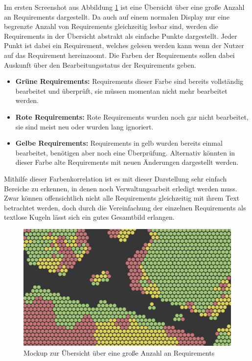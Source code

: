 Im ersten Screenshot aus Abbildung \ref{fig:wolken-2d-1} ist eine Übersicht über eine große Anzahl an Requirements dargestellt.
Da auch auf einem normalen Display nur eine begrenzte Anzahl von Requirements gleichzeitig lesbar sind, werden die Requirements in der Übersicht abstrakt als einfache Punkte dargestellt.
Jeder Punkt ist dabei ein Requirement, welches gelesen werden kann wenn der Nutzer auf das Requirement hereinzoomt.
Die Farben der Requirements sollen dabei Auskunft über den Bearbeitungsstatus der Requirements geben.
\begin{itemize}
    \item \textbf{Grüne Requirements:} Requirements dieser Farbe sind bereits vollständig bearbeitet und überprüft, sie müssen momentan nicht mehr bearbeitet werden.
    \item \textbf{Rote Requirements:} Rote Requirements wurden noch gar nicht bearbeitet, sie sind meist neu oder wurden lang ignoriert.
    \item \textbf{Gelbe Requirements:} Requirements in gelb wurden bereits einmal bearbeitet, benötigen aber noch eine Überprüfung. Alternativ könnten in dieser Farbe alte Requirements mit neuen Änderungen dargestellt werden.
\end{itemize}


Mithilfe dieser Farbenkorrelation ist es mit dieser Darstellung sehr einfach Bereiche zu erkennen, in denen noch Verwaltungsarbeit erledigt werden muss.
Zwar können offensichtlich nicht alle Requirements gleichzeitig mit ihrem Text betrachtet werden, doch durch die Vereinfachung der einzelnen Requirements als textlose Kugeln lässt sich ein gutes Gesamtbild erlangen.


\begin{figure}[H]
    \centering
    \includegraphics[width=1\textwidth]{images/FigmaWolkenOverview.png}
    \caption{Mockup zur Übersicht über eine große Anzahl an Requirements}
    \label{fig:wolken-2d-1}
\end{figure}

